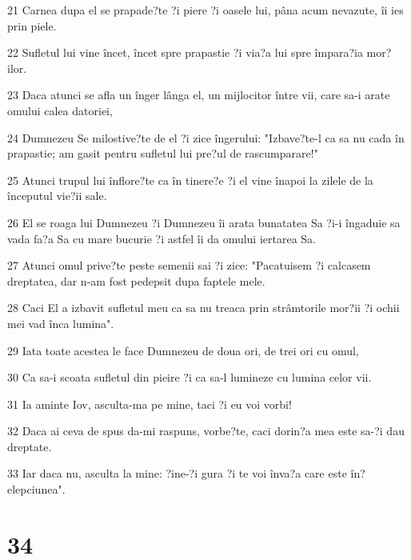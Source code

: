 \par 21 Carnea dupa el se prapade?te ?i piere ?i oasele lui, pâna acum nevazute, îi ies prin piele.
\par 22 Sufletul lui vine încet, încet spre prapastie ?i via?a lui spre împara?ia mor?ilor.
\par 23 Daca atunci se afla un înger lânga el, un mijlocitor între vii, care sa-i arate omului calea datoriei,
\par 24 Dumnezeu Se milostive?te de el ?i zice îngerului: "Izbave?te-l ca sa nu cada în prapastie; am gasit pentru sufletul lui pre?ul de rascumparare!"
\par 25 Atunci trupul lui înflore?te ca în tinere?e ?i el vine înapoi la zilele de la începutul vie?ii sale.
\par 26 El se roaga lui Dumnezeu ?i Dumnezeu îi arata bunatatea Sa ?i-i îngaduie sa vada fa?a Sa cu mare bucurie ?i astfel îi da omului iertarea Sa.
\par 27 Atunci omul prive?te peste semenii sai ?i zice: "Pacatuisem ?i calcasem dreptatea, dar n-am fost pedepsit dupa faptele mele.
\par 28 Caci El a izbavit sufletul meu ca sa nu treaca prin strâmtorile mor?ii ?i ochii mei vad înca lumina".
\par 29 Iata toate acestea le face Dumnezeu de doua ori, de trei ori cu omul,
\par 30 Ca sa-i scoata sufletul din pieire ?i ca sa-l lumineze cu lumina celor vii.
\par 31 Ia aminte Iov, asculta-ma pe mine, taci ?i eu voi vorbi!
\par 32 Daca ai ceva de spus da-mi raspuns, vorbe?te, caci dorin?a mea este sa-?i dau dreptate.
\par 33 Iar daca nu, asculta la mine: ?ine-?i gura ?i te voi înva?a care este în?elepciunea".

\chapter{34}

